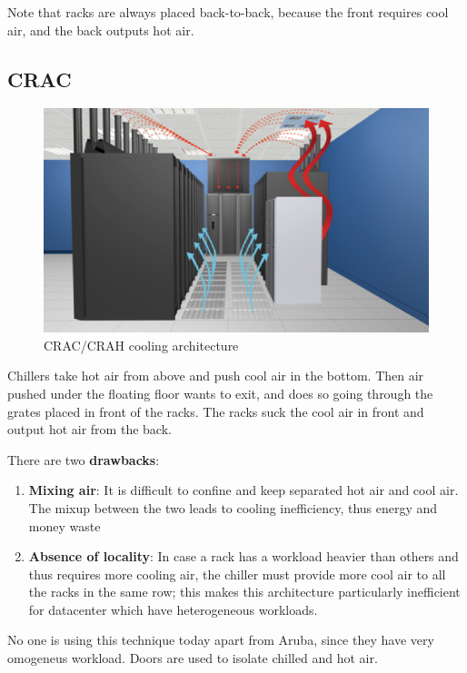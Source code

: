 Note that racks are always placed back-to-back, because the front requires cool air, and the back outputs hot air.
\subsection{CRAC}
\begin{figure}[htbp]
   \centering
   \includegraphics{images/CRAC.jpg}
   \caption{CRAC/CRAH cooling architecture}
   \label{fig:CRAC}
\end{figure}
Chillers take hot air from above and push cool air in the bottom. Then air pushed under the floating floor wants to exit, and does so going through the grates placed in front of the racks.
The racks suck the cool air in front and output hot air from the back.

{
   There are two \textbf{drawbacks}:
   \ns
\begin{enumerate}
   \item \textbf{Mixing air}: It is difficult to confine and keep separated hot air and cool air. The mixup between the two leads to cooling inefficiency, thus energy and money waste
   \item \textbf{Absence of locality}: In case a rack has a workload heavier than others and thus requires more cooling air, the chiller must provide more cool air to all the racks in the same row;
   this makes this architecture particularly inefficient for datacenter which have heterogeneous workloads.
\end{enumerate}
}

No one is using this technique today apart from Aruba, since they have very omogeneus workload. Doors are used to isolate chilled and hot air.

\newpage
